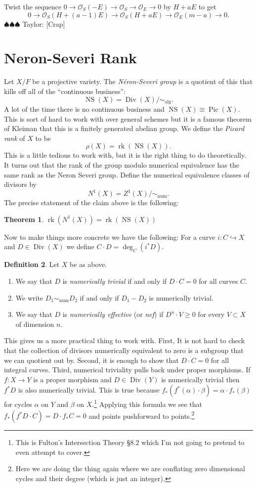 \documentclass[12pt]{article}
\numberwithin{equation}{section}
\newtheorem{theorem}{Theorem}[subsection]
\theoremstyle{definition}
\newtheorem{definition}[theorem]{Definition}
\theoremstyle{remark}
\newcommand{\Ocal}{\mathcal{O}}
\newcommand{\Div}{\operatorname{Div}}
\newcommand{\Pic}{\operatorname{Pic}}
\newcommand{\rk}{\operatorname{rk}}
\newcommand{\alg}{\operatorname{alg}}
\newcommand{\num}{\operatorname{num}}
\newcommand{\NS}{\operatorname{NS}}
\newcommand{\taylor}[1]{{\color{blue} \sf $\spadesuit\spadesuit\spadesuit$ Taylor: [#1]}}
\begin{document}
Twist the sequence $0 \to \Ocal_S(-E) \to \Ocal_S \to \Ocal_E \to 0$ by $H+aE$ to get 
$$0 \to \Ocal_S(H+(a-1)E) \to \Ocal_S(H+aE) \to \Ocal_E(m-a) \to 0.$$
\taylor{Crap}
\fi

\section{Neron-Severi Rank}
Let $X/F$ be a projective variety. 
The \emph{N\'eron-Severi group } is a quotient of this that kills off all of the ``continuous business'':
$$\NS(X) = \Div(X)/\sim_{\alg}.$$
A lot of the time there is no continuous business and $\NS(X) \cong \Pic(X)$. 
This is sort of hard to work with over general schemes but it is a famous theorem of Kleiman that this is a finitely generated abelian group.
We define the \emph{Picard rank} of $X$ to be 
$$ \rho(X) = \rk(\NS(X)).$$
This is a little tedious to work with, but it is the right thing to do theoretically. 
It turns out that the rank of the group modulo numerical equivalence has the same rank as the Neron Severi group. 
Define the numerical equivalence classes of divisors by 
$$ N^1(X) = Z^1(X)/\sim_{\num}.$$
The precise statement of the claim above is the following:
\begin{theorem}
	$\rk(N^1(X)) =\rk(\NS(X))$
\end{theorem}
Now to make things more concrete we have the following:
For a curve $i:C \hookrightarrow X$ and $D\in \Div(X)$ we define $C\cdot D = \deg_C(i^*D)$.
\begin{definition}
	Let $X$ be as above.
	\begin{enumerate}
		\item We say that $D$ is \emph{numerically trivial} if and only if $D\cdot C=0$ for all curves $C$.
		\item We write $D_1\sim_{\num}D_2$ if and only if $D_1-D_2$ is numerically trivial.
		\item We say that $D$ is \emph{numerically effective} (or \emph{nef}) if $D^n\cdot V \geq 0$ for every $V\subset X$ of dimension $n$. 
	\end{enumerate}
\end{definition}

This gives us a more practical thing to work with. 
First, It is not hard to check that the collection of divisors numerically equivalent to zero is a subgroup that we can quotient out by.
Second, it is enough to show that $D\cdot C=0$ for all integral curves. 
Third, numerical triviality pulls back under proper morphisms. 
If $f:X\to Y$ is a proper morphism and $D\in \Div(Y)$ is numerically trivial then $f^*D$ is also numerically trivial.
This is true because $f_*(f^*(\alpha)\cdot \beta) = \alpha\cdot f_*(\beta)$ for cycles $\alpha$ on $Y$ and $\beta$ on $X$.\footnote{This is Fulton's Intersection Theory \S 8.2 which I'm not going to pretend to even attempt to cover.}
Applying this formula we see that $f_*(f^*D\cdot C) = D \cdot f_*C=0$ and points pushforward to points.\footnote{Here we are doing the thing again where we are conflating zero dimensional cycles and their degree (which is just an integer).}
\end{document}
